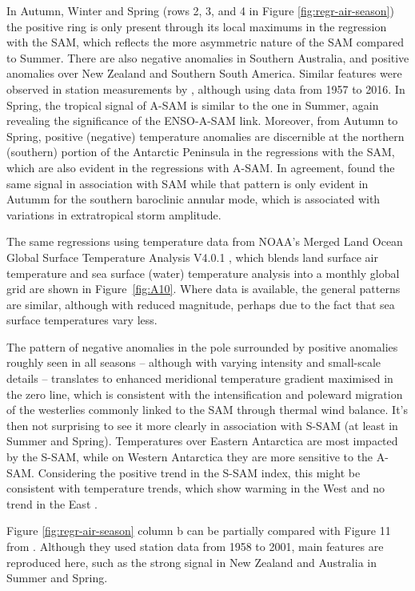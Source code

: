 \documentclass[smallextended]{svjour3}       %
\begin{document}
In Autumn, Winter and Spring (rows 2, 3, and 4 in Figure \ref{fig:regr-air-season}) the positive ring is only present through its local maximums in the regression with the SAM, which reflects the more asymmetric nature of the SAM compared to Summer.
There are also negative anomalies in Southern Australia, and positive anomalies over New Zealand and Southern South America.
Similar features were observed in station measurements by \citet{jones2019}, although using data from 1957 to 2016.
In Spring, the tropical signal of A\nobreakdash-SAM is similar to the one in Summer, again revealing the significance of the ENSO-A\nobreakdash-SAM link.
Moreover, from Autumn to Spring, positive (negative) temperature anomalies are discernible at the northern (southern) portion of the Antarctic Peninsula in the regressions with the SAM, which are also evident in the regressions with A-SAM. In agreement, \citet{marshall2016} found the same signal in association with SAM while that pattern is only evident in Autumm for the southern baroclinic annular mode, which is associated with variations in extratropical storm amplitude.

The same regressions using temperature data from NOAA's Merged Land Ocean Global Surface Temperature Analysis V4.0.1 \citep{smith2008, vose2012}, which blends land surface air temperature and sea surface (water) temperature analysis into a monthly global grid are shown in Figure~\ref{fig:A10}.
Where data is available, the general patterns are similar, although with reduced magnitude, perhaps due to the fact that sea surface temperatures vary less.

The pattern of negative anomalies in the pole surrounded by positive anomalies roughly seen in all seasons -- although with varying intensity and small-scale details -- translates to enhanced meridional temperature gradient maximised in the zero line, which is consistent with the intensification and poleward migration of the westerlies commonly linked to the SAM through thermal wind balance.
It's then not surprising to see it more clearly in association with S\nobreakdash-SAM (at least in Summer and Spring).
Temperatures over Eastern Antarctica are most impacted by the S\nobreakdash-SAM, while on Western Antarctica they are more sensitive to the A\nobreakdash-SAM.
Considering the positive trend in the S\nobreakdash-SAM index, this might be consistent with temperature trends, which show warming in the West and no trend in the East \citep{nicolas2014}.

Figure \ref{fig:regr-air-season} column b can be partially compared with Figure 11 from \citet{fogt2012}.
Although they used station data from 1958 to 2001, main features are reproduced here, such as the strong signal in New Zealand and Australia in Summer and Spring.
\end{document}
